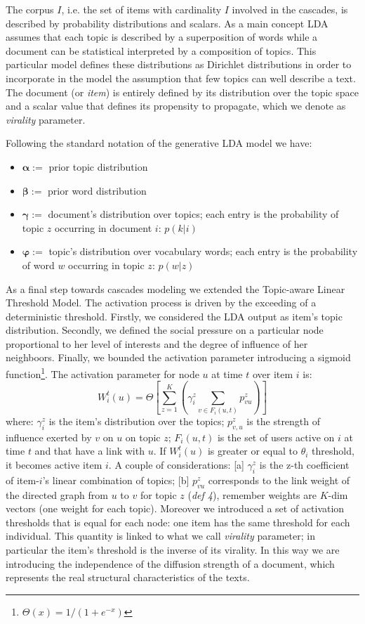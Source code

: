 The corpus $I$, i.e. the set of items with cardinality $I$ involved in the cascades, is described by probability distributions and scalars. As a main concept LDA assumes that each topic is described by a superposition of words while a document can be statistical interpreted by a composition of topics. This particular model defines these distributions as Dirichlet distributions in order to incorporate in the model the assumption that few topics can well describe a text. The document (or \textit{item}) is entirely defined by its distribution over the topic space and a scalar value that defines its propensity to propagate, which we denote as \textit{virality} parameter.

Following the standard notation of the generative LDA model we have:
\begin{itemize}
\item $\mathbf{\alpha}:=$ prior topic distribution
\item $\mathbf{\beta}:=$ prior word distribution
\item $\mathbf{\gamma}:= $ document's distribution over topics; each entry is the probability of topic $z$ occurring in document $i$: $p(k|i)$
\item $\mathbf{\varphi}:=$ topic's distribution over vocabulary words; each entry is the probability of word $w$ occurring in topic $z$: $p(w|z)$ 
\end{itemize} 

As a final step towards cascades modeling we extended the Topic-aware Linear Threshold Model. The activation process is driven by the exceeding of a deterministic threshold. Firstly, we considered the LDA output as item's topic distribution. Secondly, we defined the social pressure on a particular node proportional to her level of interests and the degree of influence of her neighboors. Finally, we bounded the activation parameter introducing a sigmoid function\footnote{$\Theta(x)=1/(1+e^{-x})$}. The activation parameter for node $u$ at time $t$ over item $i$ is:
\begin{equation}
W_i^t (u)= \Theta \left[ \sum_{z=1}^K \left(  \gamma_i^z \sum_{v \in F_{i}(u,t)} p_{vu}^z \right) \right]
\end{equation}
where:
$\gamma_i^z$ is the item's distribution over the topics;
$p_{v,u}^z$ is the strength of influence exerted by $v$ on $u$ on topic $z$;
$F_{i}(u,t)$ is the set of users active on $i$ at time $t$ and that have a link with $u$. If $W_i^t(u)$ is greater or equal to $\theta_i$ threshold, it becomes active item $i$. A couple of considerations: [a] $\gamma_i^z$ is the z-th coefficient of item-$i$'s linear combination of topics; [b] $p_{vu}^z$ corresponds to the link weight of the directed graph from $u$ to $v$ for topic $z$ (\textit{def 4}), remember weights are $K$-dim vectors (one weight for each topic).
Moreover we introduced a set of activation thresholds that is equal for each node: one item has the same threshold for each individual. This quantity is linked to what we call \textit{virality} parameter; in particular the item's threshold is the inverse of its virality. In this way we are introducing the independence of the diffusion strength of a document, which represents the real structural characteristics of the texts. 

